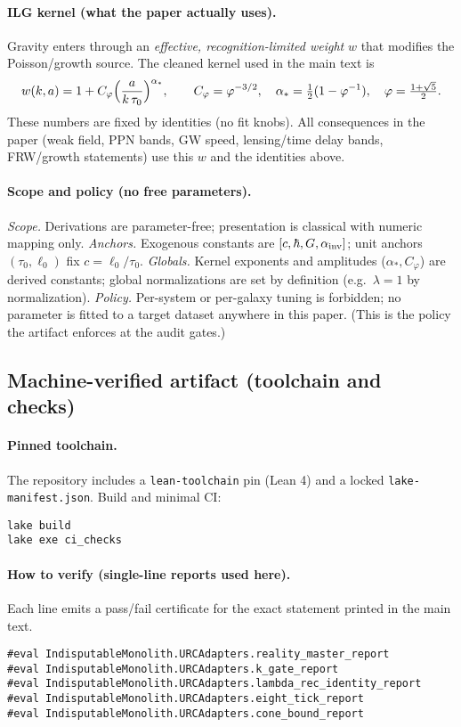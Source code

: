 \documentclass[12pt,a4paper]{article}
\begin{document}
\paragraph{ILG kernel (what the paper actually uses).}
Gravity enters through an \emph{effective, recognition-limited weight} \(w\) that modifies the Poisson/growth source. The cleaned kernel used in the main text is
\[
w(k,a)=1+C_\varphi\Bigl(\frac{a}{k\,\tau_0}\Bigr)^{\alpha_*},
\qquad
C_\varphi=\varphi^{-3/2},\quad \alpha_*=\tfrac12(1-\varphi^{-1}),\quad \varphi=\tfrac{1+\sqrt5}{2}.
\]
These numbers are fixed by identities (no fit knobs). All consequences in the paper (weak field, PPN bands, GW speed, lensing/time delay bands, FRW/growth statements) use this \(w\) and the identities above.

\paragraph{Scope and policy (no free parameters).}
\emph{Scope.} Derivations are parameter-free; presentation is classical with numeric mapping only. \emph{Anchors.} Exogenous constants are \([c,\hbar,G,\alpha_{\rm inv}]\); unit anchors \((\tau_0,\ell_0)\) fix \(c=\ell_0/\tau_0\). \emph{Globals.} Kernel exponents and amplitudes (\(\alpha_*,C_\varphi\)) are derived constants; global normalizations are set by definition (e.g.\ \(\lambda=1\) by normalization). \emph{Policy.} Per-system or per-galaxy tuning is forbidden; no parameter is fitted to a target dataset anywhere in this paper. (This is the policy the artifact enforces at the audit gates.)

\subsection{Machine-verified artifact (toolchain and checks)}
\paragraph{Pinned toolchain.}
The repository includes a \texttt{lean-toolchain} pin (Lean 4) and a locked \texttt{lake-manifest.json}. Build and minimal CI:
\begin{verbatim}
lake build
lake exe ci_checks
\end{verbatim}

\paragraph{How to verify (single-line reports used here).}
Each line emits a pass/fail certificate for the exact statement printed in the main text.
\begin{verbatim}
#eval IndisputableMonolith.URCAdapters.reality_master_report
#eval IndisputableMonolith.URCAdapters.k_gate_report
#eval IndisputableMonolith.URCAdapters.lambda_rec_identity_report
#eval IndisputableMonolith.URCAdapters.eight_tick_report
#eval IndisputableMonolith.URCAdapters.cone_bound_report
\end{verbatim}
\end{document}
